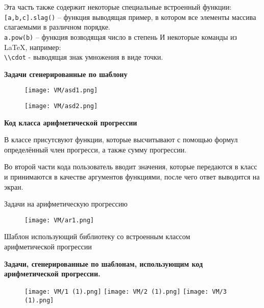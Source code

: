 Эта часть также содержит некоторые специальные встроенный функции:
\\ \texttt{[a,b,c].slag()} – функция выводящая пример, в котором все элементы массива слагаемыми в различном порядке.
\\ \texttt{a.pow(b)} – функция возводящая число в степень
И некоторые команды из LaTeX, например: 
\\  \texttt{\textbackslash \textbackslash cdot} - выводящая знак умножения в виде точки.



\newpage

\textbf{Задачи сгенерированные по шаблону}

\begin{figure}[h]
	\centering
	\texttt{[image: VM/asd1.png]}
	\end{figure}
	\begin{figure}[h]
	\centering
	\texttt{[image: VM/asd2.png]}
\end{figure}


\textbf{Код класса арифметической прогрессии}



В классе присутсвуют функции, которые высчитывают с помощью формул определённый член прогресси, а также сумму прогрессии. 

Во второй части кода пользователь вводит значения, которые передаются в класс и принимаются в качестве аргументов функциями, после чего ответ выводится на экран.

Задачи на арифметическую прогрессию

\begin{figure}[h]
	\centering
	\texttt{[image: VM/ar1.png]}
	\end{figure}
	
Шаблон использующий библиотеку со встроенным классом
\\ арифметической прогрессии



\textbf{Задачи, сгенерированные по шаблонам, использующим код
\\арифметической прогрессии.}
	\begin{figure}[h]
		\centering
		\texttt{[image: VM/1 (1).png]}
		\texttt{[image: VM/2 (1).png]}
		\texttt{[image: VM/3 (1).png]}
	\end{figure}


